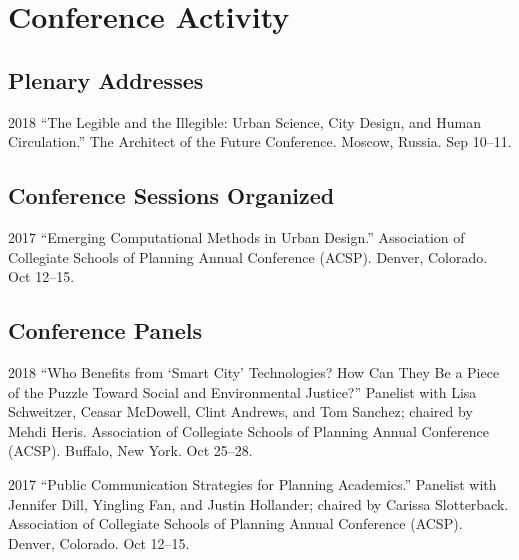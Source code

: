 \documentclass[12pt,letterpaper]{report}
\begin{document}
\section*{Conference Activity}

\subsection*{Plenary Addresses}

\begin{tablist}

\item[2018] \tab \enquote{The Legible and the Illegible: Urban Science, City Design, and Human Circulation.} The Architect of the Future Conference. Moscow, Russia. Sep 10--11.
	
\end{tablist}

\subsection*{Conference Sessions Organized}

\begin{tablist}
	
\item[2017] \tab \enquote{Emerging Computational Methods in Urban Design.} Association of Collegiate Schools of Planning Annual Conference (ACSP). Denver, Colorado. Oct 12--15.
	
\end{tablist}

\subsection*{Conference Panels}

\begin{tablist}
	
\item[2018] \tab \enquote{Who Benefits from \enquote{Smart City} Technologies? How Can They Be a Piece of the Puzzle Toward Social and Environmental Justice?} Panelist with Lisa Schweitzer, Ceasar McDowell, Clint Andrews, and Tom Sanchez; chaired by Mehdi Heris. Association of Collegiate Schools of Planning Annual Conference (ACSP). Buffalo, New York. Oct 25--28.

\item[2017] \tab \enquote{Public Communication Strategies for Planning Academics.} Panelist with Jennifer Dill, Yingling Fan, and Justin Hollander; chaired by Carissa Slotterback. Association of Collegiate Schools of Planning Annual Conference (ACSP). Denver, Colorado. Oct 12--15.

\end{tablist}
\end{document}
